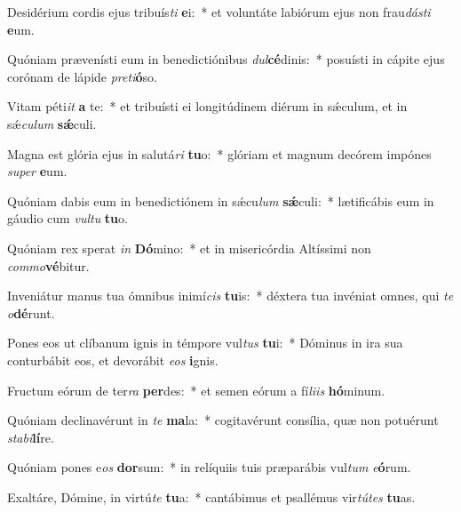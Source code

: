 \item Desidérium cordis ejus tribuís\textit{ti} \textbf{e}i:~* et voluntáte labiórum ejus non frau\textit{dás}\textit{ti} \textbf{e}um.
\item Quóniam prævenísti eum in benedictiónibus \textit{dul}\textbf{cé}dinis:~* posuísti in cápite ejus corónam de lápide \textit{pre}\textit{ti}\textbf{ó}so.
\item Vitam péti\textit{it} \textbf{a} te:~* et tribuísti ei longitúdinem diérum in sǽculum, et in sǽ\textit{cu}\textit{lum} \textbf{sǽ}culi.
\item Magna est glória ejus in salutá\textit{ri} \textbf{tu}o:~* glóriam et magnum decórem impónes \textit{su}\textit{per} \textbf{e}um.
\item Quóniam dabis eum in benedictiónem in sǽcu\textit{lum} \textbf{sǽ}culi:~* lætificábis eum in gáudio cum \textit{vul}\textit{tu} \textbf{tu}o.
\item Quóniam rex sperat \textit{in} \textbf{Dó}mino:~* et in misericórdia Altíssimi non \textit{com}\textit{mo}\textbf{vé}bitur.
\item Inveniátur manus tua ómnibus inimí\textit{cis} \textbf{tu}is:~* déxtera tua invéniat omnes, qui \textit{te} \textit{o}\textbf{dé}runt.
\item Pones eos ut clíbanum ignis in témpore vul\textit{tus} \textbf{tu}i:~* Dóminus in ira sua conturbábit eos, et devorábit \textit{e}\textit{os} \textbf{i}gnis.
\item Fructum eórum de ter\textit{ra} \textbf{per}des:~* et semen eórum a fí\textit{li}\textit{is} \textbf{hó}minum.
\item Quóniam declinavérunt in \textit{te} \textbf{ma}la:~* cogitavérunt consília, quæ non potuérunt \textit{sta}\textit{bi}\textbf{lí}re.
\item Quóniam pones e\textit{os} \textbf{dor}sum:~* in relíquiis tuis præparábis vul\textit{tum} \textit{e}\textbf{ó}rum.
\item Exaltáre, Dómine, in virtú\textit{te} \textbf{tu}a:~* cantábimus et psallémus vir\textit{tú}\textit{tes} \textbf{tu}as.
